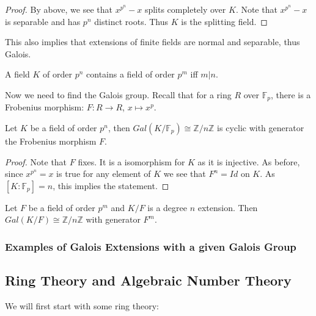 \documentclass[main.tex]{subfiles}
\begin{document}
\begin{proof}
By above, we see that $x^{p^n} -x$ splits completely over $K$. Note that $x^{p^n} -x$ is separable and has $p^n$ distinct roots. Thus $K$ is the splitting field.
\end{proof}

This also implies that extensions of finite fields are normal and separable, thus Galois.

A field $K$ of order $p^n$ contains a field of order $p^m$ iff $m | n$. 

Now we need to find the Galois group. Recall that for a ring $R$ over $\mathbb{F}_p$, there is a Frobenius morphism: $F : R \rightarrow R$, $x \mapsto x^p$.

\begin{theorem}
Let $K$ be a field of order $p^n$, then $Gal(K/\mathbb{F}_p) \cong \mathbb{Z}/n\mathbb{Z}$ is cyclic with generator the Frobenius morphism $F$.
\end{theorem}

\begin{proof}
Note that $F$ fixes. It is a isomorphism for $K$ as it is injective. As before, since $x^{p^n} = x$ is true for any element of $K$ we see that $F^n = Id$ on $K$. As $[K : \mathbb{F}_p] = n$, this implies the statement.
\end{proof}

\begin{corollary}
Let $F$ be a field of order $p^m$ and $K/F$ is a degree $n$ extension. Then $Gal(K/F) \cong \mathbb{Z}/n\mathbb{Z}$ with generator $F^m$.
\end{corollary}


\subsubsection{Examples of Galois Extensions with a given Galois Group}


\subsection{Ring Theory and Algebraic Number Theory}

We will first start with some ring theory:



\end{document}
